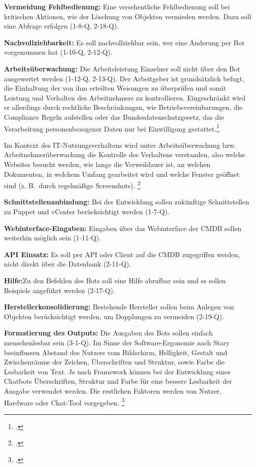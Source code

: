 \textbf{Vermeidung Fehlbedienung:} Eine versehentliche Fehlbedienung soll bei kritischen Aktionen, wie der Löschung von Objekten vermieden werden. Dazu soll eine Abfrage erfolgen (1-8-Q, 2-18-Q).

\textbf{Nachvollziehbarkeit: } Es soll nachvollziehbar sein, wer eine Änderung per Bot vorgenommen hat (1-10-Q, 2-12-Q).

\textbf{Arbeitsüberwachung:} Die Arbeitsleistung Einzelner soll nicht über den Bot ausgewertet werden (1-12-Q, 2-13-Q).
Der Arbeitgeber ist grundsätzlich befugt, die Einhaltung der von ihm erteilten Weisungen zu überprüfen und somit Leistung und Verhalten des Arbeitnehmers zu kontrollieren. Eingeschränkt wird er allerdings durch rechtliche Beschränkungen, wie Betriebsvereinbarungen, die Compliance Regeln aufstellen oder das Bundesdatenschutzgesetz, das die Verarbeitung personenbezogener Daten nur bei Einwilligung gestattet.\footcite[Vgl.][1\psqq]{Rudkowski_2015_Arbeitnehmer}

Im Kontext des IT-Nutzungsverhaltens wird unter Arbeitsüberwachung bzw. Arbeitnehmerüberwachung die Kontrolle des Verhaltens verstanden, also welche Websites besucht werden, wie lange die Verweildauer ist, an welchen Dokumenten, in welchem Umfang gearbeitet wird und welche Fenster geöffnet sind (z. B.~durch regelmäßige Screenshots).
\footcite[Vgl.][55]{Rudkowski_2015_Arbeitnehmer}

\textbf{Schnittstellenanbindung:} Bei der Entwicklung sollen zukünftige Schnittstellen zu Puppet und vCenter berücksichtigt werden (1-7-Q).

\textbf{Webinterface-Eingaben:} Eingaben über das Webinterface der \acs{CMDB} sollen weiterhin möglich sein (1-11-Q).

\textbf{API Einsatz:} Es soll per API oder Client auf die \acs{CMDB} zugegriffen werden, nicht direkt über die Datenbank (2-11-Q).

\textbf{Hilfe:}Zu den Befehlen des Bots soll eine Hilfe abrufbar sein und es sollen Beispiele angeführt werden (2-17-Q).

\textbf{Herstellerkonsolidierung:} Bestehende Hersteller sollen beim Anlegen von Objekten berücksichtigt werden, um Dopplungen zu vermeiden (2-19-Q).

\textbf{Formatierung des Outputs:} Die Ausgaben des Bots sollen einfach menschenlesbar sein (3-1-Q). Im Sinne der Software-Ergonomie nach Stary beeinflussen Abstand des Nutzers vom Bildschirm, Helligkeit, Gestalt und Zwischenräume der Zeichen, Überschriften und Struktur, sowie Farbe die Lesbarkeit von Text. Je nach Framework können bei der Entwicklung eines Chatbots Überschriften, Struktur und Farbe für eine bessere Lesbarkeit der Ausgabe verwendet werden. Die restlichen Faktoren werden von Nutzer, Hardware oder Chat-Tool vorgegeben.
\footcite[Vgl.][66\psq]{Stary_1996_Ergonomie}

